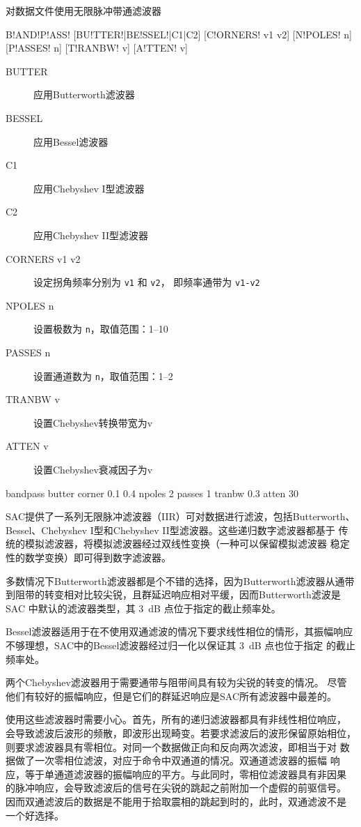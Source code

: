 \label{cmd:bandpass}

对数据文件使用无限脉冲带通滤波器

\begin{SACSTX}
B!AND!P!ASS! [BU!TTER!|BE!SSEL!|C1|C2] [C!ORNERS! v1 v2] [N!POLES! n] [P!ASSES! n]
    [T!RANBW! v] [A!TTEN! v]
\end{SACSTX}

\begin{description}
\item [BUTTER] 应用Butterworth滤波器
\item [BESSEL] 应用Bessel滤波器
\item [C1] 应用Chebyshev I型滤波器
\item [C2] 应用Chebyshev II型滤波器
\item [CORNERS v1 v2] 设定拐角频率分别为 \texttt{v1} 和 \texttt{v2}，
    即频率通带为 \texttt{v1-v2}
\item [NPOLES n] 设置极数为 \texttt{n}，取值范围：1--10
\item [PASSES n] 设置通道数为 \texttt{n}，取值范围：1--2
\item [TRANBW v] 设置Chebyshev转换带宽为v
\item [ATTEN v] 设置Chebyshev衰减因子为v
\end{description}

\begin{SACDFT}
bandpass butter corner 0.1 0.4 npoles 2 passes 1 tranbw 0.3 atten 30
\end{SACDFT}

SAC提供了一系列无限脉冲滤波器（IIR）可对数据进行滤波，包括Butterworth、
Bessel、Chebyshev I型和Chebyshev II型滤波器。这些递归数字滤波器都基于
传统的模拟滤波器，将模拟滤波器经过双线性变换（一种可以保留模拟滤波器
稳定性的数学变换）即可得到数字滤波器。

多数情况下Butterworth滤波器都是个不错的选择，因为Butterworth滤波器从通带
到阻带的转变相对比较尖锐，且群延迟响应相对平缓，因而Butterworth滤波是SAC
中默认的滤波器类型，其 \SI{3}{dB} 点位于指定的截止频率处。

Bessel滤波器适用于在不使用双通滤波的情况下要求线性相位的情形，其振幅响应
不够理想，SAC中的Bessel滤波器经过归一化以保证其 \SI{3}{\dB} 点也位于指定
的截止频率处。

两个Chebyshev滤波器用于需要通带与阻带间具有较为尖锐的转变的情况。
尽管他们有较好的振幅响应，但是它们的群延迟响应是SAC所有滤波器中最差的。

使用这些滤波器时需要小心。首先，所有的递归滤波器都具有非线性相位响应，
会导致滤波后波形的频散，即波形出现畸变。若要求滤波后的波形保留原始相位，
则要求滤波器具有零相位。对同一个数据做正向和反向两次滤波，即相当于对
数据做了一次零相位滤波，对应于命令中双通道的情况。双通道滤波器的振幅
响应，等于单通道滤波器的振幅响应的平方。与此同时，零相位滤波器具有非因果
的脉冲响应，会导致滤波后的信号在尖锐的跳起之前附加一个虚假的前驱信号。
因而双通滤波后的数据是不能用于拾取震相的跳起到时的，此时，双通滤波不是
一个好选择。

